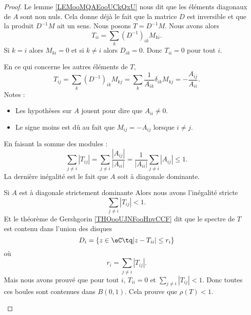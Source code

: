 \begin{proof}
    Le lemme \ref{LEMooMQAEooUCkQxU} nous dit que les éléments diagonaux de \( A\) sont non nuls. Cela donne déjà le fait que la matrice \( D\) est inversible et que la produit \( D^{-1}M\) ait un sens. Nous posons \( T=D^{-1}M\). Nous avons alors
    \begin{equation}
        T_{ii}=\sum_k(D^{-1})_{ik}M_{ki}.
    \end{equation}
    Si \( k=i\) alors \( M_{ki}=0\) et si \( k\neq i\) alors \( D_{ik}=0\). Donc \( T_{ii}=0\) pour tout \( i\). 

    En ce qui concerne les autres éléments de \( T\),
    \begin{equation}
        T_{ij}=\sum_k(D^{-1})_{ik}M_{kj}=\sum_k\frac{1}{ A_{ik} }\delta_{ik}M_{kj}=-\frac{ A_{ij} }{ A_{ii} }.
    \end{equation}
    Notes :
    \begin{itemize}
        \item 
    Les hypothèses sur \( A\) jouent pour dire que \( A_{ii}\neq 0\). 
\item
    Le signe moins est dû au fait que \( M_{ij}=-A_{ij}\) lorsque \( i\neq j\).
    \end{itemize}
    En faisant la somme des modules :
    \begin{equation}
        \sum_{j\neq i}| T_{ij} |=\sum_{j\neq i}\frac{ | A_{ij} | }{ | A_{ii} | }=\frac{1}{ | A_{ii} | }\sum_{j\neq i}| A_{ij} |\leq 1.
    \end{equation}
    La dernière inégalité est le fait que \( A\) soit à diagonale dominante.

    \begin{subproof}
    \item[Si \( A\) est à diagonale strictement dominante]
        Alors nous avons l'inégalité stricte
        \begin{equation}
            \sum_{j\neq i}| T_{ij} |<1.
        \end{equation}
        Et le théorème de Gershgorin \ref{THOooUJNFooHpvCCF} dit que le spectre de \( T\) est contenu dans l'union des disques
    \begin{equation}
        D_i=\{ z\in \eC\tq | z-T_{ii} |\leq r_i \}
    \end{equation}
    où
\begin{equation}
    r_i=\sum_{j\neq i}| T_{ij} |.
\end{equation}
Mais nous avons prouvé que pour tout \( i\), \( T_{ii}=0\) et \( \sum_{j\neq i}| T_{ij} |<1\). Donc toutes ces boules sont contenues dans \( B(0,1)\). Cela prouve que \( \rho(T)<1\).


\end{subproof}
\end{proof}
